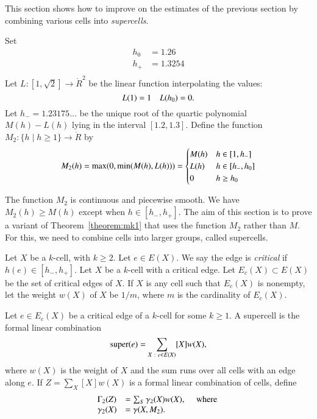 This section shows how to improve on the estimates of the previous section
by combining various cells into {\it supercells}.

\begin{definition}
Set
$$
\begin{array}{lll}
  h_0  &= 1.26\\  %
  h_+  &= 1.3254\\
\end{array}
$$
Let $L:[1,\sqrt{2}]\to\ring{R}^2$ be the linear function interpolating the
values:
$$
L(1) = 1\quad L({h_0}) = 0.
$$
Let $h_- = 1.23175\ldots$ be the unique root of the quartic polynomial
$M(h)-L(h)$ lying in the interval $[1.2,1.3]$.
Define the function $M_2:\{h\mid h\ge 1\}\to\ring{R}$ by
$$
M_2(h) = \max(0,\min(M(h),L(h))) = 
\begin{cases}
  M(h) & h \in [1,h_-]\\
  L(h) & h \in [h_-,{h_0}]\\
  0 & h \ge {h_0}\\
\end{cases}
$$
\end{definition}

The function $M_2$ is continuous and piecewise smooth.  We have
$M_2(h)\ge M(h)$ except when $h\in [h_-,h_+]$.  The aim of this section is to prove a variant of Theorem~\ref{theorem:mk1} that uses the function $M_2$ rather than $M$.  For this, we need to combine cells into larger groups, called supercells.

\begin{definition}
Let $X$ be a $k$-cell, with $k\ge 2$.  Let $e\in E(X)$.
We say the edge is {\it critical} if $h(e)\in[h_-,h_+]$.
Let $X$ be a $k$-cell with a critical edge.  Let $E_c(X)\subset E(X)$
be the set of critical edges of $X$.  If $X$ is any cell such that
$E_c(X)$ is nonempty, let the weight $w(X)$ of $X$  
be $1/m$, where
$m$ is the cardinality of $E_c(X)$.
\end{definition}

\begin{definition}
Let $e\in E_c(X)$ be a critical edge of a $k$-cell for some $k\ge 1$.
A supercell is the formal linear combination
$$
{\operatorname{super}}(e) = \sum_{X\ :\  e\in E(X)} [X] w(X),
$$
where $w(X)$ is the weight of $X$ and the sum runs over all cells with an edge along $e$.  If $Z = \sum_X [X] w(X)$ is a formal linear combination of cells, define
$$
\begin{array}{lll}
\Gamma_2(Z) &= \sum_S \gamma_2(X) w(X),\quad\hbox{ where }\\
\gamma_2(X) &= \gamma(X,M_2).
\end{array}
$$

\end{definition}


